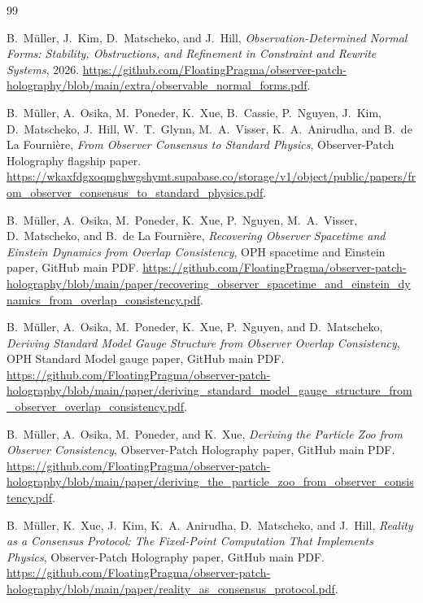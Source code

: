 \documentclass[11pt]{article}
\theoremstyle{remark}
\theoremstyle{plain}
\begin{document}
\begin{thebibliography}{99}

B.\ M\"uller, J.\ Kim, D.\ Matscheko, and J.\ Hill,
\emph{Observation-Determined Normal Forms: Stability, Obstructions, and Refinement in Constraint
and Rewrite Systems},
2026.
\url{https://github.com/FloatingPragma/observer-patch-holography/blob/main/extra/observable_normal_forms.pdf}.

B.\ M\"uller, A.\ Osika, M.\ Poneder, K.\ Xue, B.\ Cassie, P.\ Nguyen, J.\ Kim, D.\ Matscheko, J.\ Hill, W.\ T.\ Glynn, M.\ A.\ Visser, K.\ A.\ Anirudha, and B.\ de La Fourni\`ere,
\emph{From Observer Consensus to Standard Physics},
Observer-Patch Holography flagship paper.
\url{https://wkaxfdgxoqmghwgshymt.supabase.co/storage/v1/object/public/papers/from_observer_consensus_to_standard_physics.pdf}.

B.\ M\"uller, A.\ Osika, M.\ Poneder, K.\ Xue, P.\ Nguyen, M.\ A.\ Visser, D.\ Matscheko, and B.\ de La Fourni\`ere,
\emph{Recovering Observer Spacetime and Einstein Dynamics from Overlap Consistency},
OPH spacetime and Einstein paper, GitHub main PDF.
\url{https://github.com/FloatingPragma/observer-patch-holography/blob/main/paper/recovering_observer_spacetime_and_einstein_dynamics_from_overlap_consistency.pdf}.

B.\ M\"uller, A.\ Osika, M.\ Poneder, K.\ Xue, P.\ Nguyen, and D.\ Matscheko,
\emph{Deriving Standard Model Gauge Structure from Observer Overlap Consistency},
OPH Standard Model gauge paper, GitHub main PDF.
\url{https://github.com/FloatingPragma/observer-patch-holography/blob/main/paper/deriving_standard_model_gauge_structure_from_observer_overlap_consistency.pdf}.

B.\ M\"uller, A.\ Osika, M.\ Poneder, and K.\ Xue,
\emph{Deriving the Particle Zoo from Observer Consistency},
Observer-Patch Holography paper, GitHub main PDF.
\url{https://github.com/FloatingPragma/observer-patch-holography/blob/main/paper/deriving_the_particle_zoo_from_observer_consistency.pdf}.

B.\ M\"uller, K.\ Xue, J.\ Kim, K.\ A.\ Anirudha, D.\ Matscheko, and J.\ Hill,
\emph{Reality as a Consensus Protocol: The Fixed-Point Computation That Implements Physics},
Observer-Patch Holography paper, GitHub main PDF.
\url{https://github.com/FloatingPragma/observer-patch-holography/blob/main/paper/reality_as_consensus_protocol.pdf}.


\end{thebibliography}
\end{document}
